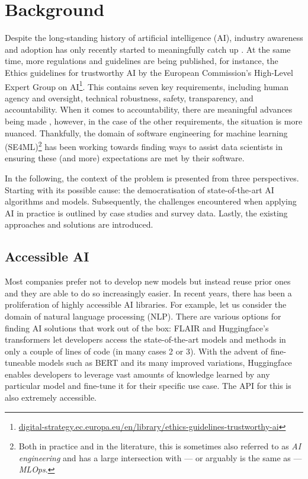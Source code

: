 \chapter{Background} \label{chapter:background}

Despite the long-standing history of artificial intelligence (AI), industry awareness and adoption has only recently started to meaningfully catch up \cite{wirtz2019artificial}. At the same time, more regulations and guidelines are being published, for instance, the Ethics guidelines for trustworthy AI by the European Commission's High-Level Expert Group on AI\footnote{\href{https://digital-strategy.ec.europa.eu/en/library/ethics-guidelines-trustworthy-ai}{digital-strategy.ec.europa.eu/en/library/ethics-guidelines-trustworthy-ai}}. This contains seven key requirements, including human agency and oversight, technical robustness, safety, transparency, and accountability. When it comes to accountability, there are meaningful advances being made \cite{raji2020closing}, however, in the case of the other requirements, the situation is more nuanced. Thankfully, the domain of software engineering for machine learning (SE4ML)\footnote{Both in practice and in the literature, this is sometimes also referred to as \textit{AI engineering} and has a large intersection with --- or arguably is the same as --- \textit{MLOps}.} has been working towards finding ways to assist data scientists in ensuring these (and more) expectations are met by their software.

In the following, the context of the problem is presented from three perspectives. Starting with its possible cause: the democratisation of state-of-the-art AI algorithms and models. Subsequently, the challenges encountered when applying AI in practice is outlined by case studies and survey data. Lastly, the existing approaches and solutions are introduced.

\section{Accessible AI} \label{section:accessible-ai}

Most companies prefer not to develop new models but instead reuse prior ones \cite{bosch2021engineering} and they are able to do so increasingly easier. In recent years, there has been a proliferation of highly accessible AI libraries. For example, let us consider the domain of natural language processing (NLP). There are various options for finding AI solutions that work out of the box: FLAIR \cite{akbik2019flair} and Huggingface's transformers \cite{wolf2019huggingface} let developers access the state-of-the-art models and methods in only a couple of lines of code (in many cases 2 or 3). With the advent of fine-tuneable models such as BERT \cite{devlin2018bert} and its many improved variations, Huggingface enables developers to leverage vast amounts of knowledge learned by any particular model and fine-tune it for their specific use case. The API for this is also extremely accessible.

